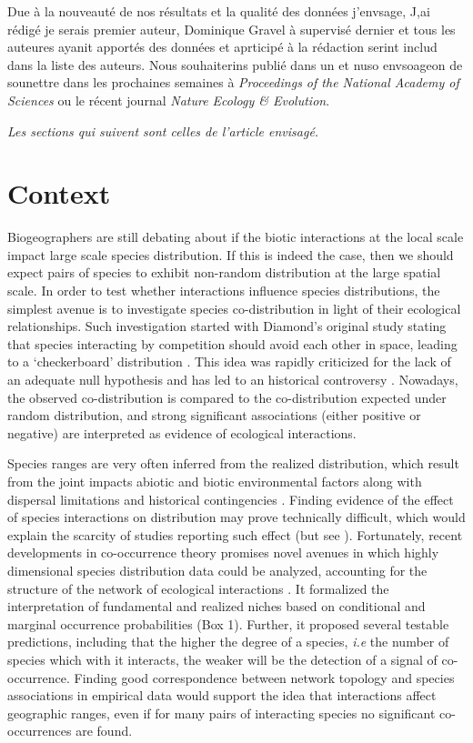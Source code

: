 Due à la nouveauté de nos résultats et la qualité des données j'envsage, J,ai rédigé je serais premier auteur, Dominique Gravel à supervisé dernier et tous les auteures ayanit apportés des données et aprticipé à la rédaction serint includ dans la liste des auteurs. Nous souhaiterins publié dans un et nuso envsoageon de sounettre dans les prochaines semaines à \emph{Proceedings of the National Academy of Sciences} ou le récent journal \emph{Nature Ecology \& Evolution}.



\emph{Les sections qui suivent sont celles de l'article envisagé.}


\newpage
\section{Context}\label{context}

Biogeographers are still debating about if the biotic interactions at
the local scale impact large scale species distribution. If this is
indeed the case, then we should expect pairs of species to exhibit
non-random distribution at the large spatial scale. In order to test
whether interactions influence species distributions, the simplest
avenue is to investigate species co-distribution in light of their
ecological relationships. Such investigation started with Diamond's
original study stating that species interacting by competition should
avoid each other in space, leading to a `checkerboard' distribution
\citep{Diamond1975}. This idea was rapidly criticized for the lack of an
adequate null hypothesis \citep{Connor1979, Gilpin1982} and has led to
an historical controversy \citep{Hutchinson1959}. Nowadays, the observed
co-distribution is compared to the co-distribution expected under random
distribution, and strong significant associations (either positive or
negative) are interpreted as evidence of ecological interactions.

Species ranges are very often inferred from the realized distribution,
which result from the joint impacts abiotic and biotic environmental
factors along with dispersal limitations and historical contingencies
\citep{Pulliam2000, Holt2009, Araujo2014}. Finding evidence of the
effect of species interactions on distribution may prove technically
difficult, which would explain the scarcity of studies reporting such
effect (but see \citet{Gotelli2010}). Fortunately, recent developments
in co-occurrence theory promises novel avenues in which highly
dimensional species distribution data could be analyzed, accounting for
the structure of the network of ecological interactions
\citep{Cazelles2016}. It formalized the interpretation of fundamental
and realized niches based on conditional and marginal occurrence
probabilities (Box 1). Further, it proposed several testable
predictions, including that the higher the degree of a species,
\emph{i.e} the number of species which with it interacts, the weaker
will be the detection of a signal of co-occurrence. Finding good
correspondence between network topology and species associations in
empirical data would support the idea that interactions affect
geographic ranges, even if for many pairs of interacting species no
significant co-occurrences are found.

